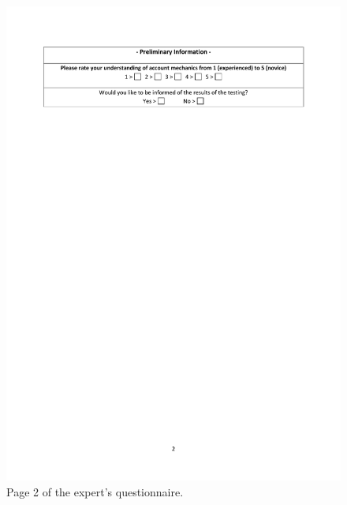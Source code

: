\begin{figure}[ht]
\centering
\includegraphics[scale=0.6]{qa2}
\caption{Page 2 of the expert's questionnaire.}
\label{fig:qa2}
\end{figure}

